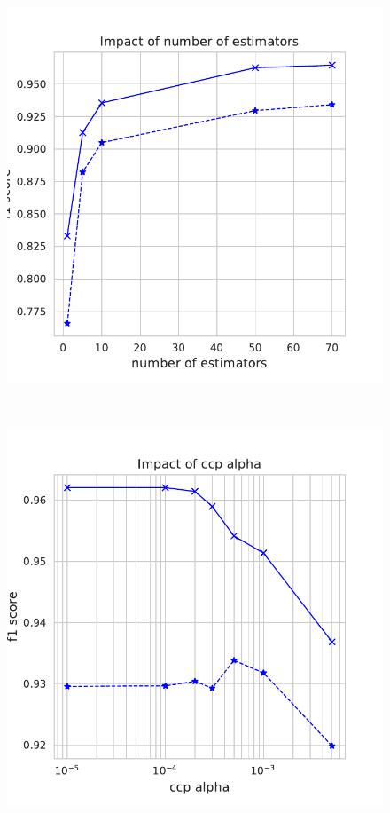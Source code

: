 \documentclass[11pt]{article}
\begin{document}
\begin{figure}
\begin{minipage}[l]{0.3\textwidth}
\end{minipage}
\begin{minipage}[l]{0.3\textwidth}
\includegraphics[width=1\linewidth]{email_spam/rnd_trees.pdf}
\end{minipage}\\
\begin{minipage}[t]{0.3\textwidth}
\includegraphics[width=1\linewidth]{email_spam/rnd_ccpalpha.pdf}

\end{minipage}
\end{figure}
\end{document}

